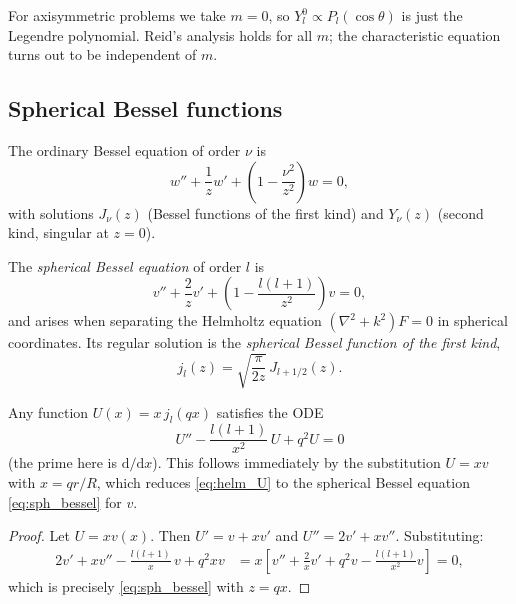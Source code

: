 \documentclass[12pt]{article}
\newcommand{\dd}{\mathrm{d}}
\theoremstyle{definition}
\begin{document}
For axisymmetric problems we take $m=0$, so $Y_l^0 \propto P_l(\cos\theta)$ is just the
Legendre polynomial. Reid's analysis holds for all $m$; the characteristic equation
turns out to be independent of $m$.

\subsection{Spherical Bessel functions}
\label{sec:bessel}

The ordinary Bessel equation of order $\nu$ is
\begin{equation}
  w'' + \frac{1}{z}w' + \left(1 - \frac{\nu^2}{z^2}\right)w = 0,
\end{equation}
with solutions $J_\nu(z)$ (Bessel functions of the first kind) and $Y_\nu(z)$
(second kind, singular at $z=0$).

The \emph{spherical Bessel equation} of order $l$ is
\begin{equation}
  v'' + \frac{2}{z}v' + \left(1 - \frac{l(l+1)}{z^2}\right)v = 0,
  \label{eq:sph_bessel}
\end{equation}
and arises when separating the Helmholtz equation $(\nabla^2 + k^2)F = 0$ in spherical
coordinates. Its regular solution is the \emph{spherical Bessel function of the first kind},
\begin{equation}
  j_l(z) = \sqrt{\frac{\pi}{2z}}\,J_{l+1/2}(z).
\end{equation}

\begin{notebox}
Any function $U(x) = x\,j_l(qx)$ satisfies the ODE
\begin{equation}
  U'' - \frac{l(l+1)}{x^2}\,U + q^2 U = 0
  \label{eq:helm_U}
\end{equation}
(the prime here is $\dd/\dd x$). This follows immediately by the substitution $U = xv$
with $x = qr/R$, which reduces \eqref{eq:helm_U} to the spherical Bessel equation
\eqref{eq:sph_bessel} for $v$.

\begin{proof}
Let $U = xv(x)$. Then $U' = v + xv'$ and $U'' = 2v' + xv''$. Substituting:
\begin{align*}
  2v' + xv'' - \frac{l(l+1)}{x}\,v + q^2 xv
  &= x\!\left[v'' + \frac{2}{x}v' + q^2 v - \frac{l(l+1)}{x^2}v\right] = 0,
\end{align*}
which is precisely \eqref{eq:sph_bessel} with $z = qx$.
\end{proof}
\end{notebox}
\end{document}
